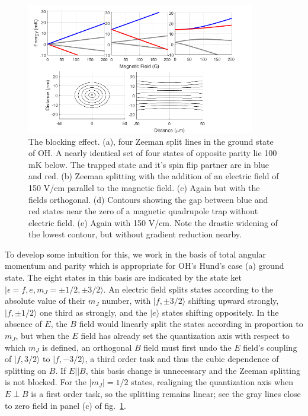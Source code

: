 \documentclass[%
 reprint,
 amsmath,amssymb,
 aps,
prl,
]{revtex4-1}
\begin{document}
\begin{figure}
\includegraphics[width=100mm]{blocking.png}%
\caption{
The blocking effect. (a), four Zeeman split lines in the ground state of OH. A nearly identical set of four states of opposite parity lie 100 mK below. The trapped state and it's spin flip partner are in blue and red. (b) Zeeman splitting with the addition of an electric field of 150 V/cm parallel to the magnetic field. (c) Again but with the fields orthogonal. (d) Contours showing the gap between blue and red states near the zero of a magnetic quadrupole trap without electric field. (e) Again with 150 V/cm. Note the drastic widening of the lowest contour, but without gradient reduction nearby.
\label{fig:blocking}}
\end{figure}

To develop some intuition for this, we work in the basis of total angular momentum and parity which is appropriate for OH's Hund's case (a) ground state. The eight states in this basis are indicated by the state ket $|\epsilon=f,e,m_J=\pm1/2,\pm3/2\rangle$. An electric field splits states according to the absolute value of their $m_J$ number, with $|f,\pm3/2\rangle$ shifting upward strongly, $|f,\pm1/2\rangle$ one third as strongly, and the $|e\rangle$ states shifting oppositely. In the absence of $E$, the $B$ field would linearly split the states according in proportion to $m_J$, but when the $E$ field has already set the quantization axis with respect to which $m_J$ is defined, an orthogonal $B$ field must first undo the $E$ field's coupling of $|f,3/2\rangle$ to $|f,-3/2\rangle$, a third order task and thus the cubic dependence of splitting on $B$. If $E||B$, this basis change is unnecessary and the Zeeman splitting is not blocked. For the $|m_J|=1/2$ states, realigning the quantization axis when $E\!\perp\! B$ is a first order task, so the splitting remains linear; see the gray lines close to zero field in panel (c) of fig.~\ref{fig:blocking}. 
\end{document}
